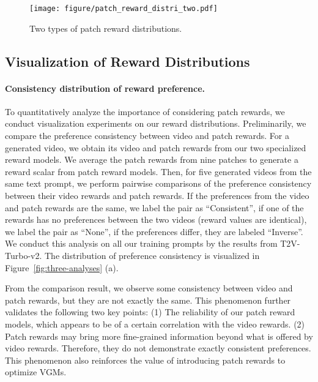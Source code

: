 \begin{figure}[t]
    \centering
    \texttt{[image: figure/patch\_reward\_distri\_two.pdf]}
    \caption{Two types of patch reward distributions. 
    }
    \vspace{-5pt}
    \label{fig:patch-distribution}
\end{figure}
\subsection{Visualization of Reward Distributions}
\paragraph{Consistency distribution of reward preference.}
To quantitatively analyze the importance of considering patch rewards, we conduct visualization experiments on our reward distributions. 
Preliminarily, we compare the preference consistency between video and patch rewards. For a generated video, we obtain its video and patch rewards from our two specialized reward models. We average the patch rewards from nine patches to generate a reward scalar from patch reward models. Then, for five generated videos from the same text prompt, we perform pairwise comparisons of the preference consistency between their video rewards and patch rewards. If the preferences from the video and patch rewards are the same, we label the pair as ``Consistent'', if one of the rewards has no preferences between the two videos (reward values are identical), we label the pair as ``None'', if the preferences differ, they are labeled ``Inverse''. We conduct this analysis on all our training prompts by the results from T2V-Turbo-v2. The distribution of preference consistency is visualized in Figure~\ref{fig:three-analyses} (a). 

From the comparison result, we observe some consistency between video and patch rewards, but they are not exactly the same. This phenomenon further validates the following two key points: (1) The reliability of our patch reward models, which appears to be of a certain correlation with the video rewards. (2) Patch rewards may bring more fine-grained information beyond what is offered by video rewards. Therefore, they do not demonstrate exactly consistent preferences. This phenomenon also reinforces the value of introducing patch rewards to optimize VGMs.

